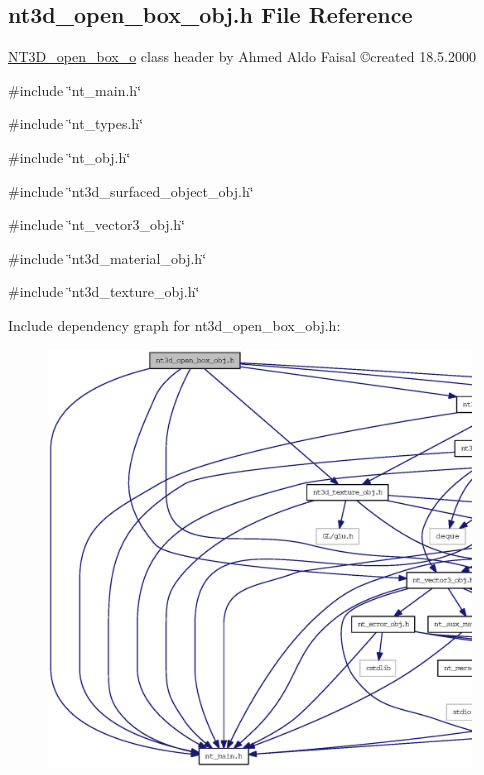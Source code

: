 \subsection{nt3d\_\-open\_\-box\_\-obj.h File Reference}
\label{nt3d__open__box__obj_8h}



\begin{DoxyItemize}
\item \hyperlink{class_n_t3_d__open__box__o}{NT3D\_\-open\_\-box\_\-o} class header by Ahmed Aldo Faisal \copyright created 18.5.2000 
\end{DoxyItemize} 


{\ttfamily \#include \char`\"{}nt\_\-main.h\char`\"{}}\par
{\ttfamily \#include \char`\"{}nt\_\-types.h\char`\"{}}\par
{\ttfamily \#include \char`\"{}nt\_\-obj.h\char`\"{}}\par
{\ttfamily \#include \char`\"{}nt3d\_\-surfaced\_\-object\_\-obj.h\char`\"{}}\par
{\ttfamily \#include \char`\"{}nt\_\-vector3\_\-obj.h\char`\"{}}\par
{\ttfamily \#include \char`\"{}nt3d\_\-material\_\-obj.h\char`\"{}}\par
{\ttfamily \#include \char`\"{}nt3d\_\-texture\_\-obj.h\char`\"{}}\par
Include dependency graph for nt3d\_\-open\_\-box\_\-obj.h:
\nopagebreak
\begin{figure}[H]
\begin{center}
\leavevmode
\includegraphics[width=400pt]{nt3d__open__box__obj_8h__incl}
\end{center}
\end{figure}
